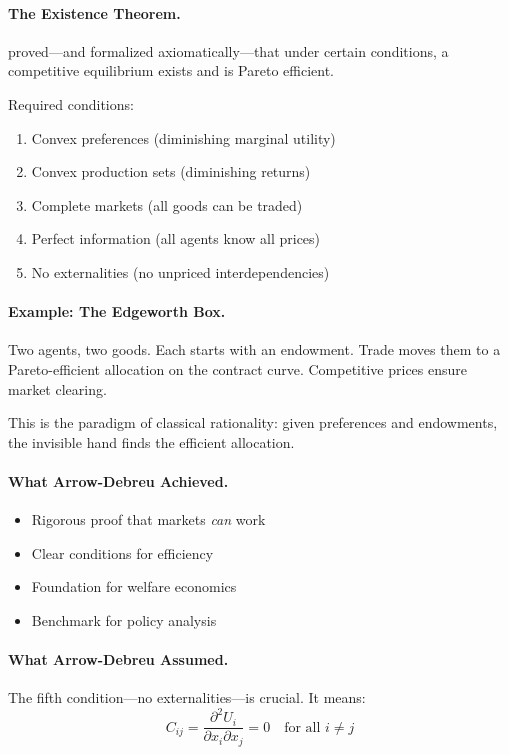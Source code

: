 \documentclass[12pt,a4paper]{article}
\begin{document}
\paragraph{The Existence Theorem.}
\citet{arrowdeb} proved---and \citet{debreu1959} formalized axiomatically---that under certain conditions,
a competitive equilibrium exists and is Pareto efficient.

Required conditions:
\begin{enumerate}
  \item Convex preferences (diminishing marginal utility)
  \item Convex production sets (diminishing returns)
  \item Complete markets (all goods can be traded)
  \item Perfect information (all agents know all prices)
  \item No externalities (no unpriced interdependencies)
\end{enumerate}

\paragraph{Example: The Edgeworth Box.}
Two agents, two goods. Each starts with an endowment.
Trade moves them to a Pareto-efficient allocation on the contract curve.
Competitive prices ensure market clearing.

This is the paradigm of classical rationality:
given preferences and endowments, the invisible hand finds the efficient allocation.

\paragraph{What Arrow-Debreu Achieved.}
\begin{itemize}
  \item Rigorous proof that markets \emph{can} work
  \item Clear conditions for efficiency
  \item Foundation for welfare economics
  \item Benchmark for policy analysis
\end{itemize}

\paragraph{What Arrow-Debreu Assumed.}
The fifth condition---no externalities---is crucial.
It means:
\begin{equation}
  C_{ij} = \frac{\partial^2 U_i}{\partial x_i \partial x_j} = 0 
  \quad \text{for all } i \neq j
\end{equation}
\end{document}
